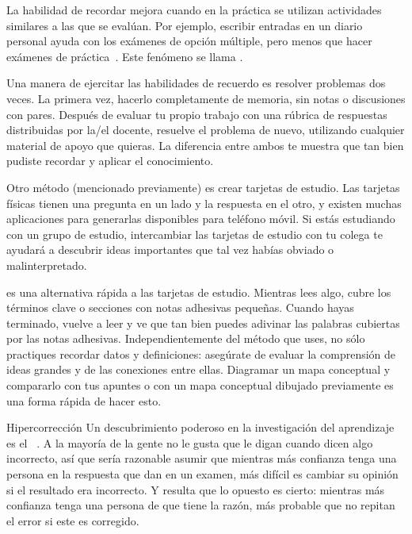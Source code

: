 La habilidad de recordar mejora cuando en la práctica se utilizan actividades similares a las que se evalúan.
Por ejemplo,
escribir entradas en un diario personal ayuda con los exámenes de opción múltiple,
pero menos que hacer exámenes de práctica~\cite{Mill2016a}.
Este fenómeno se llama
.

Una manera de ejercitar las habilidades de recuerdo es resolver problemas dos veces.
La primera vez,
hacerlo completamente de memoria, sin notas o discusiones con pares.
Después de evaluar tu propio trabajo con una rúbrica de respuestas distribuidas por la/el docente,
resuelve el problema de nuevo, utilizando cualquier material de apoyo que quieras.
La diferencia entre ambos te muestra que tan bien pudiste recordar y aplicar el conocimiento.

Otro método (mencionado previamente) es crear tarjetas de estudio.
Las tarjetas físicas tienen una pregunta en un lado y la respuesta en el otro,
y existen muchas aplicaciones para generarlas disponibles para teléfono móvil.
Si estás estudiando con un grupo de estudio,
intercambiar las tarjetas de estudio con tu colega
te ayudará a descubrir ideas importantes que tal vez habías obviado o malinterpretado.

es una alternativa rápida a las tarjetas de estudio.
Mientras lees algo,
cubre los términos clave o secciones con notas adhesivas pequeñas.
Cuando hayas terminado,
vuelve a leer y ve que tan bien puedes adivinar las palabras cubiertas por las notas adhesivas.
Independientemente del método que uses,
no sólo practiques recordar datos y definiciones:
asegúrate de evaluar la comprensión de ideas grandes
y de las conexiones entre ellas.
Diagramar un mapa conceptual y compararlo con tus apuntes
o con un mapa conceptual dibujado previamente
es una forma rápida de hacer esto.

\begin{aside}{Hipercorrección}
    Un descubrimiento poderoso en la investigación del aprendizaje es
  el ~\cite{Metc2016}.
  A la mayoría de la gente no le gusta que le digan cuando dicen algo incorrecto,
  así que sería razonable asumir que
  mientras más confianza tenga una persona en la respuesta que dan en un examen,
  más difícil es cambiar su opinión si el resultado era incorrecto.
  Y resulta que lo opuesto es cierto:
  mientras más confianza tenga una persona de que tiene la razón,
  más probable que no repitan el error si este es corregido.
\end{aside}

